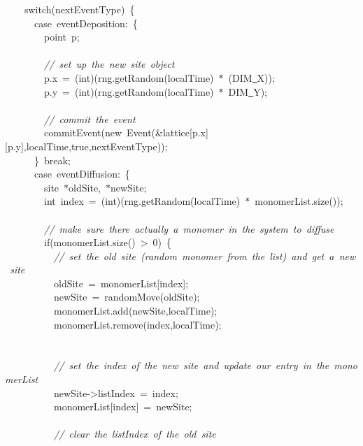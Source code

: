 {\ \ \ \ switch(nextEventType)\ \{\\
\ \ \ \ \ \ case\ eventDeposition:\ \{\\
\ \ \ \ \ \ \ \ point\ p;\\
\ \\
\ \ \ \ \ \ \ \ \textsl{//\ set\ up\ the\ new\ site\ object}\\
\ \ \ \ \ \ \ \ p.x\ =\ (int)(rng.getRandom(localTime)\ $\ast$\ (DIM\underline\ X));\\
\ \ \ \ \ \ \ \ p.y\ =\ (int)(rng.getRandom(localTime)\ $\ast$\ DIM\underline\ Y);\\
\ \\
\ \ \ \ \ \ \ \ \textsl{//\ commit\ the\ event}\\
\ \ \ \ \ \ \ \ commitEvent(new\ Event(\&lattice[p.x][p.y],localTime,true,nextEventType));\\
\ \ \ \ \ \ \}\ break;\\
\ \ \ \ \ \ case\ eventDiffusion:\ \{\\
\ \ \ \ \ \ \ \ site\ $\ast$oldSite,\ $\ast$newSite;\\
\ \ \ \ \ \ \ \ int\ index\ =\ (int)(rng.getRandom(localTime)\ $\ast$\ monomerList.size());\\
\ \\
\ \ \ \ \ \ \ \ \textsl{//\ make\ sure\ there\ actually\ a\ monomer\ in\ the\ system\ to\ diffuse}\\
\ \ \ \ \ \ \ \ if(monomerList.size()\ >{}\ 0)\ \{\\
\ \ \ \ \ \ \ \ \ \ \textsl{//\ set\ the\ old\ site\ (random\ monomer\ from\ the\ list)\ and\ get\ a\ new\ site}\\
\ \ \ \ \ \ \ \ \ \ oldSite\ =\ monomerList[index];\\
\ \ \ \ \ \ \ \ \ \ newSite\ =\ randomMove(oldSite);\\
\ \ \ \ \ \ \ \ \ \ monomerList.add(newSite,localTime);\\
\ \ \ \ \ \ \ \ \ \ monomerList.remove(index,localTime);\\
\ \\
\ \\
\ \ \ \ \ \ \ \ \ \ \textsl{//\ set\ the\ index\ of\ the\ new\ site\ and\ update\ our\ entry\ in\ the\ monomerList}\\
\ \ \ \ \ \ \ \ \ \ newSite-{}>{}listIndex\ =\ index;\\
\ \ \ \ \ \ \ \ \ \ monomerList[index]\ =\ newSite;\\
\ \\
\ \ \ \ \ \ \ \ \ \ \textsl{//\ clear\ the\ listIndex\ of\ the\ old\ site}\\
}
